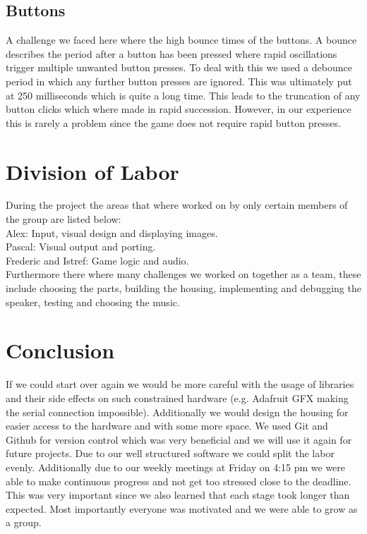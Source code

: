 \documentclass[10pt, a4paper]{article}
\begin{document}
\subsection*{Buttons}
A challenge we faced here where the high bounce times of the buttons. A bounce describes the period after a button has been pressed where rapid oscillations trigger multiple unwanted button presses. To deal with this we used a debounce period in which any further button presses are ignored. This was ultimately put at 250 milliseconds which is quite a long time. This leads to the truncation of any button clicks which where made in rapid succession. However, in our experience this is rarely a problem since the game does not require rapid button presses. 

\section*{Division of Labor}
During the project the areas that where worked on by only certain members of the group are listed below:\\
Alex: Input, visual design and displaying images.\\
Pascal: Visual output and porting.\\
Frederic and Istref: Game logic and audio.\\
Furthermore there where many challenges we worked on together as a team, these include choosing the parts, building the housing, implementing and debugging the speaker, testing and choosing the music.

\section*{Conclusion}

If we could start over again we would be more careful with the usage of libraries and their side effects on such constrained hardware (e.g. Adafruit GFX making the serial connection impossible). 
Additionally we would design the housing for easier access to the hardware and with some more space. We used Git and Github for version control which was very beneficial and we will use it again for future projects. Due to our well structured software we could split the labor evenly. Additionally due to our weekly meetings at Friday on 4:15 pm we were able to make continuous progress and not get too stressed close to the deadline. This was very important since we also learned that each stage took longer than expected. 
Most importantly everyone was motivated and we were able to grow as a group. 
\end{document}
